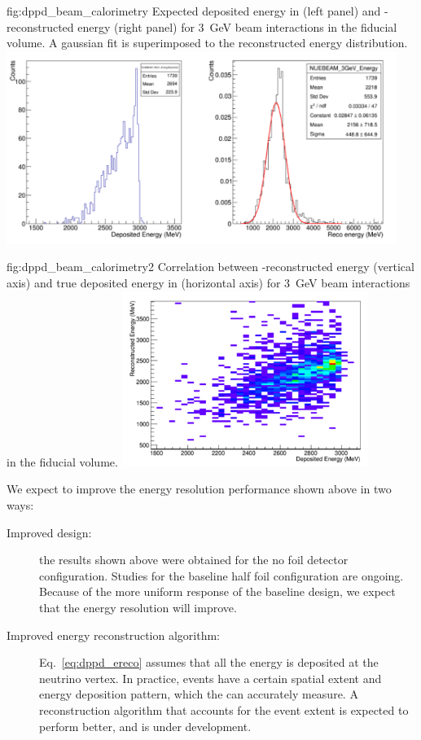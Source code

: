 \begin{dunefigure}{fig:dppd_beam_calorimetry}
{Expected deposited energy in \lar (left panel) and -reconstructed energy (right panel) for \SI{3}{\GeV} beam \nue {} interactions in the \lar fiducial volume. A gaussian fit is superimposed to the reconstructed energy distribution.}
\includegraphics[width=0.95\textwidth]{graphics/dppd_beam_calorimetry.pdf} 
\end{dunefigure}

\begin{dunefigure}{fig:dppd_beam_calorimetry2}
{Correlation between -reconstructed energy (vertical axis) and true deposited energy in \lar (horizontal axis) for \SI{3}{\GeV} beam \nue {} interactions in the \lar fiducial volume.}
\includegraphics[width=0.60\textwidth]{graphics/dppd_beam_calorimetry2.pdf} 
\end{dunefigure}

We expect to improve the energy resolution performance shown above in two ways:
\begin{description}
   \item[Improved  design:] the results shown above were obtained for the no  foil detector configuration. Studies for the baseline half foil configuration are ongoing. Because of the more uniform response of the baseline design, we expect that the energy resolution will improve.  
   \item[Improved energy reconstruction algorithm:] Eq.~\ref{eq:dppd_ereco} assumes that all the energy is deposited at the neutrino vertex. In practice, events have a certain spatial extent and energy deposition pattern, which the  can accurately measure. A reconstruction algorithm that accounts for the event extent is expected to perform better, and is under development.
\end{description}
 